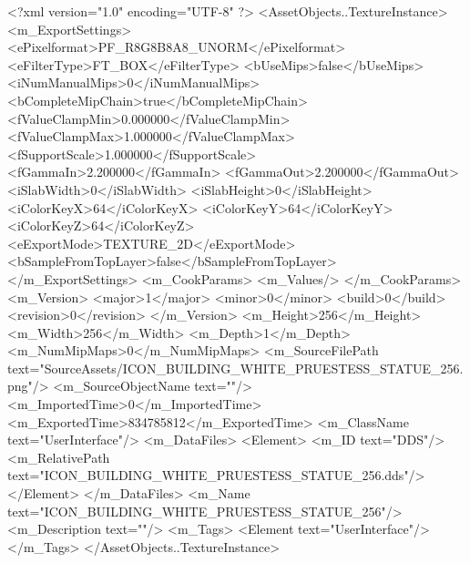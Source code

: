 <?xml version="1.0" encoding="UTF-8" ?>
<AssetObjects..TextureInstance>
	<m_ExportSettings>
		<ePixelformat>PF_R8G8B8A8_UNORM</ePixelformat>
		<eFilterType>FT_BOX</eFilterType>
		<bUseMips>false</bUseMips>
		<iNumManualMips>0</iNumManualMips>
		<bCompleteMipChain>true</bCompleteMipChain>
		<fValueClampMin>0.000000</fValueClampMin>
		<fValueClampMax>1.000000</fValueClampMax>
		<fSupportScale>1.000000</fSupportScale>
		<fGammaIn>2.200000</fGammaIn>
		<fGammaOut>2.200000</fGammaOut>
		<iSlabWidth>0</iSlabWidth>
		<iSlabHeight>0</iSlabHeight>
		<iColorKeyX>64</iColorKeyX>
		<iColorKeyY>64</iColorKeyY>
		<iColorKeyZ>64</iColorKeyZ>
		<eExportMode>TEXTURE_2D</eExportMode>
		<bSampleFromTopLayer>false</bSampleFromTopLayer>
	</m_ExportSettings>
	<m_CookParams>
		<m_Values/>
	</m_CookParams>
	<m_Version>
		<major>1</major>
		<minor>0</minor>
		<build>0</build>
		<revision>0</revision>
	</m_Version>
	<m_Height>256</m_Height>
	<m_Width>256</m_Width>
	<m_Depth>1</m_Depth>
	<m_NumMipMaps>0</m_NumMipMaps>
	<m_SourceFilePath text="SourceAssets/ICON_BUILDING_WHITE_PRUESTESS_STATUE_256.png"/>
	<m_SourceObjectName text=""/>
	<m_ImportedTime>0</m_ImportedTime>
	<m_ExportedTime>834785812</m_ExportedTime>
	<m_ClassName text="UserInterface"/>
	<m_DataFiles>
		<Element>
			<m_ID text="DDS"/>
			<m_RelativePath text="ICON_BUILDING_WHITE_PRUESTESS_STATUE_256.dds"/>
		</Element>
	</m_DataFiles>
	<m_Name text="ICON_BUILDING_WHITE_PRUESTESS_STATUE_256"/>
	<m_Description text=""/>
	<m_Tags>
		<Element text="UserInterface"/>
	</m_Tags>
</AssetObjects..TextureInstance>

